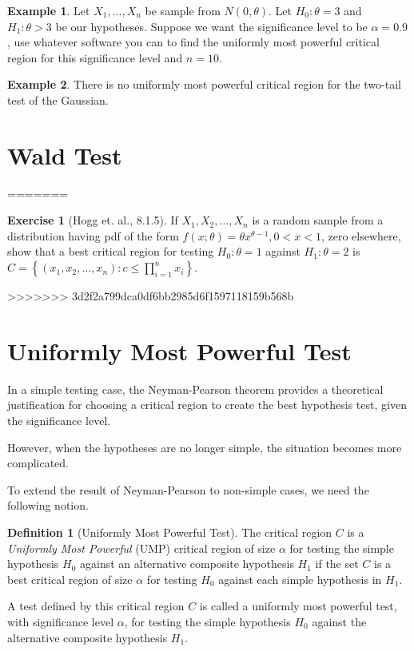 \documentclass[
  openany]{book}
\theoremstyle{definition}
\newtheorem{definition}{Definition}[chapter]
\theoremstyle{definition}
\newtheorem{example}{Example}[chapter]
\theoremstyle{definition}
\newtheorem{exercise}{Exercise}[chapter]
\theoremstyle{definition}
\theoremstyle{remark}
\begin{document}
\begin{example}
Let \(X_1, \dots, X_n\) be sample from \(N(0, \theta)\).
Let \(H_0: \theta = 3\) and \(H_1: \theta >3\) be our hypotheses.
Suppose we want the significance level to be \(\alpha = 0.9\),
use whatever software you can to find the uniformly most
powerful critical region for this significance level and \(n = 10\).
\end{example}

\begin{example}
There is no uniformly most powerful critical region for the two-tail test of the Gaussian.
\end{example}

\section{Wald Test}\label{wald-test}
=======
\begin{exercise}[Hogg et. al., 8.1.5]
If \(X_1, X_2, \ldots, X_n\) is a random sample from a distribution having pdf of the form \(f(x ; \theta)=\theta x^{\theta-1}, 0<x<1\), zero elsewhere, show that a best critical region for testing \(H_0: \theta=1\) against \(H_1: \theta=2\) is \(C=\left\{\left(x_1, x_2, \ldots, x_n\right): c \leq \prod_{i=1}^n x_i\right\}\).
\end{exercise}
>>>>>>> 3d2f2a799dca0df6bb2985d6f1597118159b568b

\hypertarget{uniformly-most-powerful-test}{%
\section{Uniformly Most Powerful Test}\label{uniformly-most-powerful-test}}

In a simple testing case, the Neyman-Pearson theorem provides a theoretical justification for
choosing a critical region to create the best hypothesis test, given
the significance level.

However, when the hypotheses are no longer simple, the situation becomes more complicated.

To extend the result of Neyman-Pearson to non-simple cases, we need the following notion.

\begin{definition}[Uniformly Most Powerful Test]
The critical region \(C\) is a \emph{Uniformly Most Powerful} (UMP) critical region
of size \(\alpha\) for testing the simple hypothesis \(H_0\) against an
alternative composite hypothesis \(H_1\) if the set \(C\) is a best critical
region of size \(\alpha\) for testing \(H_0\) against each simple
hypothesis in \(H_1\).

A test defined by this critical region \(C\) is
called a uniformly most powerful test, with significance level \(\alpha\),
for testing the simple hypothesis \(H_0\) against the alternative composite hypothesis \(H_1\).
\end{definition}
\end{document}
